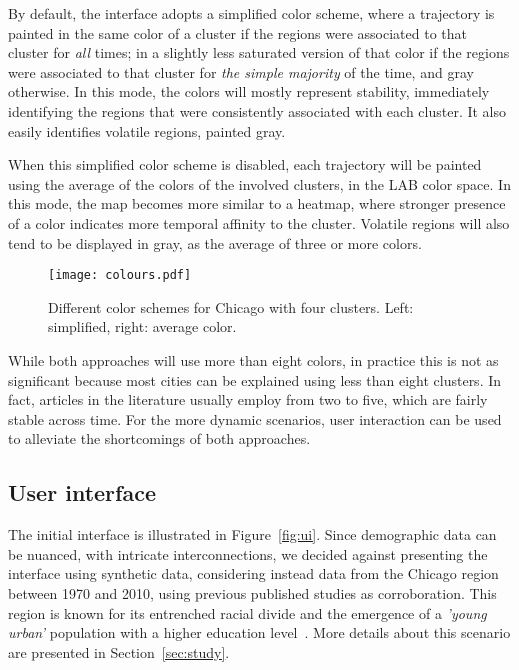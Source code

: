 By default, the interface adopts a simplified color scheme, where a trajectory
is painted in the same color of a cluster if the regions were associated to that
cluster for \emph{all} times; in a slightly less saturated version of that color
if the regions were associated to that cluster for \emph{the simple majority} of
the time, and gray otherwise. In this mode, the colors will mostly represent
stability, immediately identifying the regions that were consistently associated
with each cluster. It also easily identifies volatile regions, painted gray.


When this simplified color scheme is disabled, each trajectory will be painted
using the average of the colors of the involved clusters, in the LAB color
space. In this mode, the map becomes more similar to a heatmap, where stronger
presence of a color indicates more temporal affinity to the cluster. Volatile
regions will also tend to be displayed in gray, as the average of three or more
colors.

\begin{figure}
    \centering 
    \texttt{[image: colours.pdf]}
    \caption{Different color schemes for Chicago with four clusters. Left:
    simplified, right: average color.\label{fig:colour}}
\end{figure}

While both approaches will use more than eight colors, in practice this is not
as significant because most cities can be explained using less than eight
clusters.  In fact, articles in the literature usually employ from two to five,
which are fairly stable across time. For the more dynamic scenarios, user
interaction can be used to alleviate the shortcomings of both approaches.


\subsection{User interface}
The initial interface is illustrated in Figure~\ref{fig:ui}. Since demographic
data can be nuanced, with intricate interconnections, we decided against
presenting the interface using synthetic data, considering instead data from the
Chicago region between 1970 and 2010, using previous published studies as
corroboration. This region is known for its entrenched racial divide and the
emergence of a \emph{'young urban'} population with a higher education
level~\cite{Delmelle2016,Delmelle2017}. More details about this scenario are
presented in Section~\ref{sec:study}.

